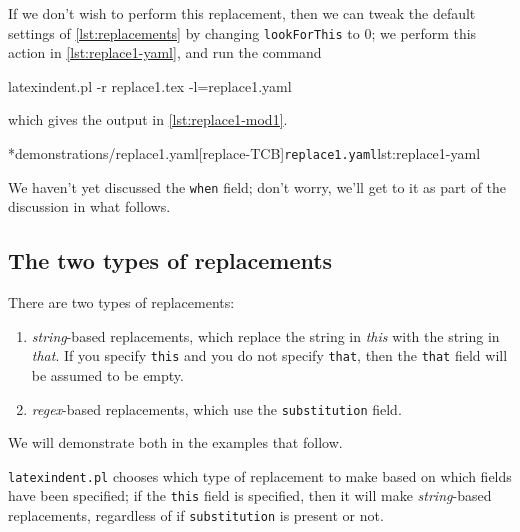 	If we don't wish to perform this replacement, then we can tweak the default settings of
	\vref{lst:replacements} by changing \texttt{lookForThis} to 0; we perform this action
	in \cref{lst:replace1-yaml}, and run the command
	\begin{commandshell}
latexindent.pl -r replace1.tex -l=replace1.yaml
\end{commandshell}
	which gives the output in \cref{lst:replace1-mod1}.

	\begin{cmhtcbraster}[raster column skip=.01\linewidth]
		\cmhlistingsfromfile*[style=yaml-LST]*{demonstrations/replace1.yaml}[replace-TCB]{\texttt{replace1.yaml}}{lst:replace1-yaml}
	\end{cmhtcbraster}
	We haven't yet discussed the \texttt{when} field; don't worry, we'll get to it
	as part of the discussion in what follows.

\subsection{The two types of replacements}
	There are two types of replacements:
	\begin{enumerate}
		\item \emph{string}-based replacements, which replace the string in
		      \emph{this} with the string in \emph{that}.
		      If you specify \texttt{this} and you do not specify \texttt{that}, then
		      the \texttt{that} field will be assumed to be empty.
		\item \emph{regex}-based replacements, which use the \texttt{substitution} field.
	\end{enumerate}
	We will demonstrate both in the examples that follow.

	\texttt{latexindent.pl} chooses which type of replacement to make based on which fields
	have been specified; if the \texttt{this} field is specified, then it will make
	\emph{string}-based replacements, regardless of if \texttt{substitution} is
	present or not.

